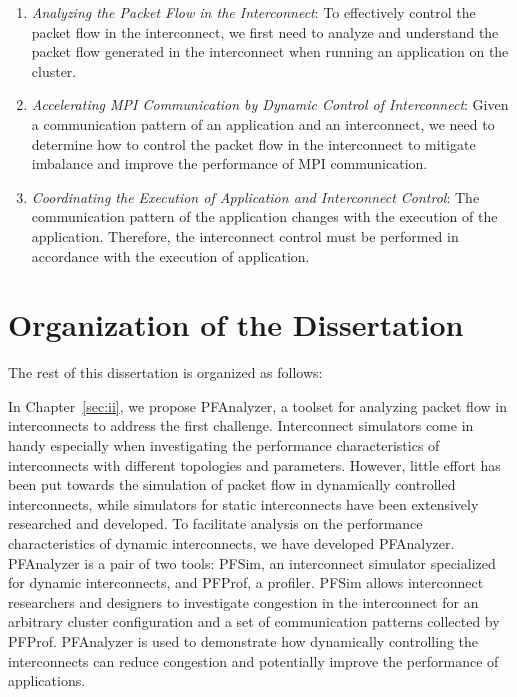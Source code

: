 \begin{enumerate}
\item \emph{Analyzing the Packet Flow in the Interconnect}:
    To effectively control the packet flow in the interconnect, we first need
    to analyze and understand the packet flow generated in the interconnect
    when running an application on the cluster.
\item \emph{Accelerating MPI Communication by Dynamic Control of Interconnect}:
    Given a communication pattern of an application and an interconnect,
    we need to determine how to control the packet flow in the interconnect to
    mitigate imbalance and improve the performance of MPI communication.
\item \emph{Coordinating the Execution of Application and Interconnect Control}:
    The communication pattern of the application changes with the execution of
    the application. Therefore, the interconnect control must be performed in
    accordance with the execution of application.
\end{enumerate}

\section{Organization of the Dissertation}

The rest of this dissertation is organized as follows:

In Chapter~\ref{sec:ii}, we propose PFAnalyzer, a toolset for analyzing packet
flow in interconnects to address the first challenge. Interconnect simulators
come in handy especially when investigating the performance characteristics of
interconnects with different topologies and parameters. However, little effort
has been put towards the simulation of packet flow in dynamically controlled
interconnects, while simulators for static interconnects have been extensively
researched and developed. To facilitate analysis on the performance
characteristics of dynamic interconnects, we have developed PFAnalyzer.
PFAnalyzer is a pair of two tools: PFSim, an interconnect simulator
specialized for dynamic interconnects, and PFProf, a profiler. PFSim allows
interconnect researchers and designers to investigate congestion in the
interconnect for an arbitrary cluster configuration and a set of communication
patterns collected by PFProf. PFAnalyzer is used to demonstrate how
dynamically controlling the interconnects can reduce congestion and
potentially improve the performance of applications.


